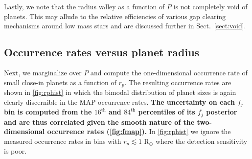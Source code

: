\documentclass[twocolumn]{emulateapj}
\begin{document}
Lastly, we note that the radius valley as a function of $P$ is not completely void of planets.
This may allude to the relative efficiencies of various gap clearing mechanisms around low mass stars and
are discussed further in Sect.~\ref{sect:void}.


\subsection{Occurrence rates versus planet radius}
Next, we marginalize over $P$ and compute the one-dimensional occurrence rate of small close-in planets
as a function of $r_p$. The resulting occurrence rates are shown in \autoref{fig:rphist} in which the bimodal
distribution of planet sizes is again clearly discernible in the MAP occurrence rates.
\textbf{The uncertainty on each $f_j$ bin is computed from the $16^{\text{th}}$ and $84^{\text{th}}$ percentiles
  of its $f_j$ posterior and are thus correlated given the smooth nature of the two-dimensional occurrence
  rates (\autoref{fig:fmap}).}
In \autoref{fig:rphist} we ignore the measured occurrence rates in bins with
$r_p\lesssim 1$ R$_{\oplus}$ where the detection sensitivity is poor.
\end{document}
